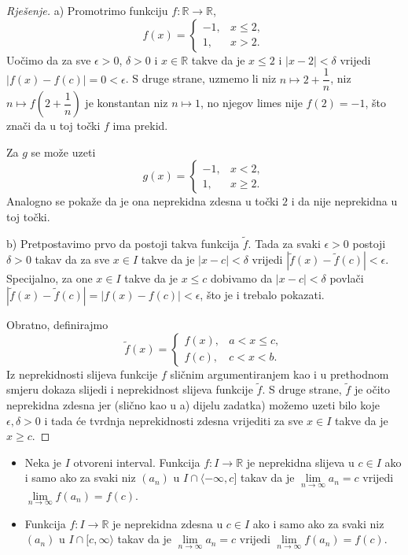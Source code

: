 \begin{proof}[Rješenje]
a) Promotrimo funkciju $f : \mathbb{R}\to \mathbb{R}$,
$$f(x)=\begin{cases}
-1 ,& x\leq 2,\\
1, & x>2.
\end{cases}$$
Uočimo da za sve $\epsilon>0$, $\delta>0$ i $x\in \mathbb{R}$ takve da je $x\leq 2$ i $|x-2|<\delta$ vrijedi $\left\lvert f(x)-f(c)\right\rvert=0<\epsilon$. S druge strane, uzmemo li niz $n\mapsto 2+\dfrac{1}{n}$, niz $n\mapsto f\left(2+\dfrac{1}{n}\right)$ je konstantan niz $n\mapsto 1$, no njegov limes nije $f(2)=-1$, što znači da u toj točki $f$ ima prekid.

Za $g$ se može uzeti
$$g(x)=\begin{cases}
-1 ,& x< 2,\\
1, & x\geq 2.
\end{cases}$$
Analogno se pokaže da je ona neprekidna zdesna u točki $2$ i da nije neprekidna u toj točki.

b) Pretpostavimo prvo da postoji takva funkcija $\tilde{f}$. Tada za svaki $\epsilon>0$ postoji $\delta>0$ takav da za sve $x\in I$ takve da je $\left\lvert x-c\right\rvert<\delta$ vrijedi $\left\lvert \tilde{f}(x)-\tilde{f}(c)\right\rvert<\epsilon$. Specijalno, za one $x\in I$ takve da je $x\leq c$ dobivamo da $\left\lvert x-c\right\rvert<\delta$ povlači $\left\lvert \tilde{f}(x)-\tilde{f}(c)\right\rvert=\left\lvert f(x)-f(c)\right\rvert<\epsilon$, što je i trebalo pokazati.

Obratno, definirajmo
$$\tilde{f}(x)=\begin{cases}
f(x), & a<x\leq c,\\
f(c), & c<x<b.
\end{cases}$$
Iz neprekidnosti slijeva funkcije $f$ sličnim argumentiranjem kao i u prethodnom smjeru dokaza slijedi i neprekidnost slijeva funkcije $\tilde{f}$. S druge strane, $\tilde{f}$ je očito neprekidna zdesna jer (slično kao u a) dijelu zadatka) možemo uzeti bilo koje $\epsilon, \delta>0$ i tada će tvrdnja neprekidnosti zdesna vrijediti za sve $x\in I$ takve da je $x\geq c$.
\end{proof}
\begin{remark}
\label{Heineonesided} \textbf{}
\begin{itemize}
\item Neka je $I$ otvoreni interval. Funkcija $f : I\to \mathbb{R}$ je neprekidna slijeva u $c\in I$ ako i samo ako za svaki niz $(a_n)$ u $I\cap \langle -\infty, c]$ takav da je $\lim\limits_{n\to \infty}{a_n}=c$ vrijedi $\lim\limits_{n\to\infty}{f(a_n)}=f(c)$.

\item Funkcija $f : I\to \mathbb{R}$ je neprekidna zdesna u $c\in I$ ako i samo ako za svaki niz $(a_n)$ u $I\cap [c, \infty\rangle$ takav da je $\lim\limits_{n\to \infty}{a_n}=c$ vrijedi $\lim\limits_{n\to\infty}{f(a_n)}=f(c)$.
\end{itemize}
\end{remark}
